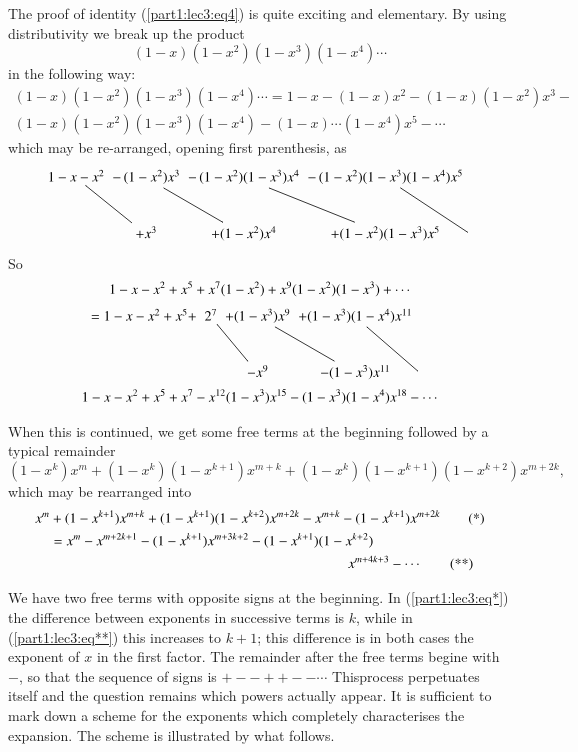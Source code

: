The proof of identity (\ref{part1:lec3:eq4}) is quite exciting and elementary. By using
distributivity  we break up the product
$$
(1-x)(1-x^2)(1-x^3)(1-x^4)\cdots
$$
in the following way:
\begin{multline*}
  (1-x)(1-x^2)(1-x^3)(1-x^4)\cdots
  = 1-x-(1-x)x^2-(1-x)(1-x^2)x^3-\\
  (1-x)(1-x^2)(1-x^3)(1-x^4)-(1-x)\cdots (1-x^4)x^5- \cdots
\end{multline*}
which may be re-arranged, opening first parenthesis, as
\[
\xymatrix@C=-.01cm{
  \ar@{-}[dr] 1-x-x^2 & -\,(1-x^2)x^3\ar@{-}[dr] & -\,
  (1-x^2)(1-x^3)x^4\ar@{-}[dr] & -\,(1-x^2)(1-x^3)(1-x^4)x^5\ar@{-}[dr]& \\ 
  & + x^3 & + (1-x^2)x^4 & + (1-x^2)(1-x^3)x^5&  }
\]
So\pageoriginale  \quad 
\begin{multline*}
  1-x-x^2+x^5+x^7 (1-x^2)+ x^9 (1-x^2)(1-x^3)+\cdots\\
  \xymatrix@C=-.01cm{= 1-x-x^2+ x^5 + & 2^7 \ar@{-}[dr] & + (1-x^3)x^9
    \ar@{-}[dr] & + (1-x^3) (1-x^4)x^{11}\ar@{-}[dr]& \\
  & & -x^9 & -(1-x^3)x^{11} & &}\\
  1-x-x^2+x^5+x^7 -x^{12}(1-x^3) x^{15} -(1-x^3)(1-x^4)x^{18}-\cdots
\end{multline*}

When this is continued, we get some free terms at the beginning
followed by a typical remainder
$$
(1-x^k)x^m + (1-x^k)(1-x^{k+1})x^{m+k} + (1-x^k)(1-x^{k+1})(1-x^{k+2})
x^{m+2k}, 
$$
which may be rearranged into
\begin{align*}
  x^m & + (1-x^{k+1}) x^{m+k} + (1-x^{k+1}) (1-x^{k+2}) x^{m+2k}-
  x^{m+k} - (1-x^{k+1}) x^{m+2k}\tag{*}\label{part1:lec3:eq*}\\
  & = x^m - x^{m+2k+1} - (1-x^{k+1}) x^{m+3k+2}- (1-x^{k+1})
  (1-x^{k+2})\\
   & \hspace{7.5cm}x^{m+4k+3}- \cdots \tag{**}\label{part1:lec3:eq**}
\end{align*}

We have two free terms with opposite signs at the beginning. In
(\ref{part1:lec3:eq*})
the difference between exponents in successive terms is $k$, while in
(\ref{part1:lec3:eq**}) this increases to $k+1$; this difference is in
both cases the 
exponent of $x$ in the first factor. The remainder after the free
terms begine with $-$, so that the sequence of signs is $+ -- ++ --
\cdots$ This\pageoriginale  process perpetuates itself and the question remains which
powers actually appear. It is sufficient to mark down a scheme for the
exponents which completely characterises the expansion. The scheme is
illustrated by what follows.

